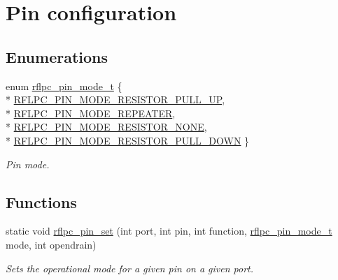 \hypertarget{group__pinconf}{\section{Pin configuration}
\label{group__pinconf}
}
\subsection*{Enumerations}
\begin{DoxyCompactItemize}
\item 
enum \hyperlink{group__pinconf_gaf01a7075a0fa0280ce8cda6074e10ad7}{rflpc\-\_\-pin\-\_\-mode\-\_\-t} \{ \\*
\hyperlink{group__pinconf_ggaf01a7075a0fa0280ce8cda6074e10ad7a9d82c49b9c018ff2b920e137275c0597}{R\-F\-L\-P\-C\-\_\-\-P\-I\-N\-\_\-\-M\-O\-D\-E\-\_\-\-R\-E\-S\-I\-S\-T\-O\-R\-\_\-\-P\-U\-L\-L\-\_\-\-U\-P}, 
\\*
\hyperlink{group__pinconf_ggaf01a7075a0fa0280ce8cda6074e10ad7a8bdf8899d29cb1a148de0c9ccd48ebe5}{R\-F\-L\-P\-C\-\_\-\-P\-I\-N\-\_\-\-M\-O\-D\-E\-\_\-\-R\-E\-P\-E\-A\-T\-E\-R}, 
\\*
\hyperlink{group__pinconf_ggaf01a7075a0fa0280ce8cda6074e10ad7a43bddd615d78856319abed1ff7b46414}{R\-F\-L\-P\-C\-\_\-\-P\-I\-N\-\_\-\-M\-O\-D\-E\-\_\-\-R\-E\-S\-I\-S\-T\-O\-R\-\_\-\-N\-O\-N\-E}, 
\\*
\hyperlink{group__pinconf_ggaf01a7075a0fa0280ce8cda6074e10ad7add82961450c5f20a87bbe6529d2c450b}{R\-F\-L\-P\-C\-\_\-\-P\-I\-N\-\_\-\-M\-O\-D\-E\-\_\-\-R\-E\-S\-I\-S\-T\-O\-R\-\_\-\-P\-U\-L\-L\-\_\-\-D\-O\-W\-N}
 \}
\begin{DoxyCompactList}\small\item\em Pin mode. \end{DoxyCompactList}\end{DoxyCompactItemize}
\subsection*{Functions}
\begin{DoxyCompactItemize}
\item 
static void \hyperlink{group__pinconf_ga7b817f77b0ceb4f59822a1298d6c9a7d}{rflpc\-\_\-pin\-\_\-set} (int port, int pin, int function, \hyperlink{group__pinconf_gaf01a7075a0fa0280ce8cda6074e10ad7}{rflpc\-\_\-pin\-\_\-mode\-\_\-t} mode, int opendrain)
\begin{DoxyCompactList}\small\item\em Sets the operational mode for a given pin on a given port. \end{DoxyCompactList}\end{DoxyCompactItemize}


